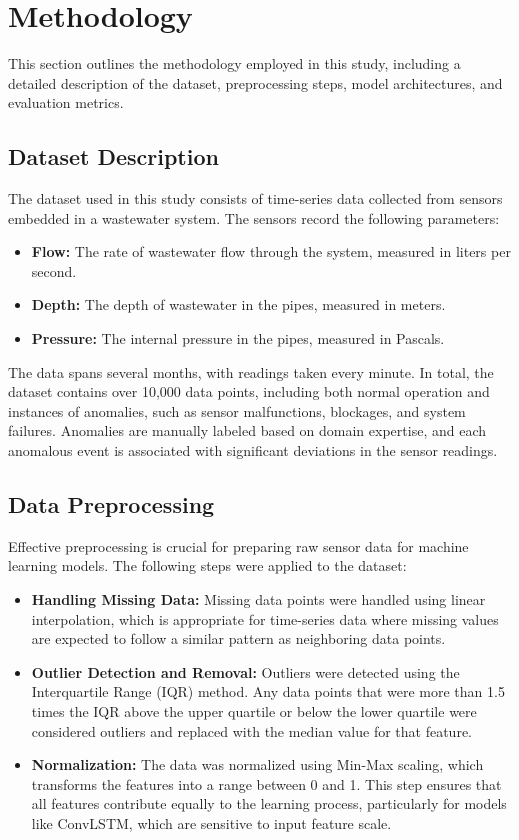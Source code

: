 \documentclass[conference]{IEEEtran}
\begin{document}
\section{Methodology}
\label{sec:method}
This section outlines the methodology employed in this study, including a detailed description of the dataset, preprocessing steps, model architectures, and evaluation metrics.

\subsection{Dataset Description}
The dataset used in this study consists of time-series data collected from sensors embedded in a wastewater system. The sensors record the following parameters:
\begin{itemize}
    \item \textbf{Flow:} The rate of wastewater flow through the system, measured in liters per second.
    \item \textbf{Depth:} The depth of wastewater in the pipes, measured in meters.
    \item \textbf{Pressure:} The internal pressure in the pipes, measured in Pascals.
\end{itemize}

The data spans several months, with readings taken every minute. In total, the dataset contains over 10,000 data points, including both normal operation and instances of anomalies, such as sensor malfunctions, blockages, and system failures. Anomalies are manually labeled based on domain expertise, and each anomalous event is associated with significant deviations in the sensor readings.

\subsection{Data Preprocessing}
Effective preprocessing is crucial for preparing raw sensor data for machine learning models. The following steps were applied to the dataset:
\begin{itemize}
    \item \textbf{Handling Missing Data:} Missing data points were handled using linear interpolation, which is appropriate for time-series data where missing values are expected to follow a similar pattern as neighboring data points.
    \item \textbf{Outlier Detection and Removal:} Outliers were detected using the Interquartile Range (IQR) method. Any data points that were more than 1.5 times the IQR above the upper quartile or below the lower quartile were considered outliers and replaced with the median value for that feature.
    \item \textbf{Normalization:} The data was normalized using Min-Max scaling, which transforms the features into a range between 0 and 1. This step ensures that all features contribute equally to the learning process, particularly for models like ConvLSTM, which are sensitive to input feature scale.
\end{itemize}
\end{document}
